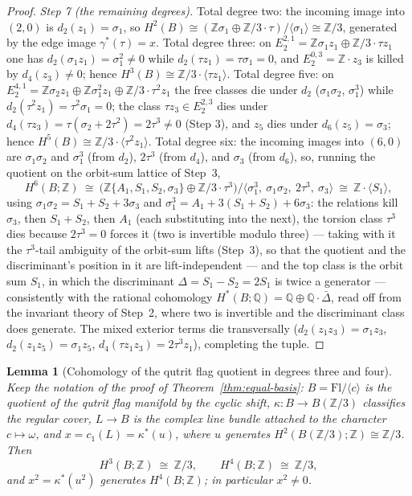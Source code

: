 \documentclass[11pt,a4paper]{article}
\newtheorem{lemma}[theorem]{Lemma}
\begin{document}
\begin{proof}
\emph{Step 7 (the remaining degrees).} Total degree two: the incoming image
into $(2,0)$ is $d_2(z_1)=\sigma_1$, so
$H^2(B)\cong(\mathbb Z\sigma_1\oplus\mathbb Z/3\cdot\tau)/\langle\sigma_1
\rangle\cong\mathbb Z/3$, generated by the edge image
$\gamma^*(\tau)=x$. Total degree three: on
$E_2^{2,1}=\mathbb Z\sigma_1z_1\oplus\mathbb Z/3\cdot\tau z_1$ one has
$d_2(\sigma_1z_1)=\sigma_1^2\ne0$ while $d_2(\tau z_1)=\tau\sigma_1=0$, and
$E_2^{0,3}=\mathbb Z\cdot z_3$ is killed by $d_4(z_3)\ne0$; hence
$H^3(B)\cong\mathbb Z/3\cdot\langle\tau z_1\rangle$. Total degree five: on
$E_2^{4,1}=\mathbb Z\sigma_2z_1\oplus\mathbb Z\sigma_1^2z_1\oplus\mathbb
Z/3\cdot\tau^2z_1$ the free classes die under $d_2$
($\sigma_1\sigma_2$, $\sigma_1^3$) while $d_2(\tau^2z_1)=\tau^2\sigma_1=0$;
the class $\tau z_3\in E_2^{2,3}$ dies under $d_4(\tau z_3)=
\tau(\sigma_2+2\tau^2)=2\tau^3\ne0$ (Step 3), and $z_5$ dies under
$d_6(z_5)=\sigma_3$; hence $H^5(B)\cong\mathbb Z/3\cdot\langle\tau^2z_1
\rangle$. Total degree six: the incoming images into $(6,0)$ are
$\sigma_1\sigma_2$ and $\sigma_1^3$ (from $d_2$), $2\tau^3$ (from $d_4$),
and $\sigma_3$ (from $d_6$), so, running the quotient on the orbit-sum
lattice of Step~3,
\[
H^6(B;\mathbb Z)\ \cong\ \bigl(\mathbb Z\{A_1,S_1,S_2,\sigma_3\}\oplus
\mathbb Z/3\cdot\tau^3\bigr)\big/\langle\sigma_1^3,\ \sigma_1\sigma_2,\
2\tau^3,\ \sigma_3\rangle\ \cong\ \mathbb Z\cdot\langle S_1\rangle,
\]
using $\sigma_1\sigma_2=S_1+S_2+3\sigma_3$ and
$\sigma_1^3=A_1+3(S_1+S_2)+6\sigma_3$: the relations kill $\sigma_3$, then
$S_1+S_2$, then $A_1$ (each substituting into the next), the torsion class
$\tau^3$ dies because $2\tau^3=0$ forces it (two is invertible modulo
three) --- taking with it the $\tau^3$-tail ambiguity of the orbit-sum
lifts (Step~3), so that the quotient and the discriminant's position in it
are lift-independent --- and the top class is the orbit sum $S_1$, in which
the discriminant
$\Delta=S_1-S_2=2S_1$ is twice a generator --- consistently with the
rational cohomology $H^*(B;\mathbb Q)=\mathbb Q\oplus\mathbb Q\cdot
\bar\Delta$, read off from the invariant theory of Step~2, where two is
invertible and the discriminant class does generate. The mixed exterior terms die
transversally ($d_2(z_1z_3)=\sigma_1z_3$, $d_2(z_1z_5)=\sigma_1z_5$,
$d_4(\tau z_1z_3)=2\tau^3z_1$), completing the tuple.
\end{proof}

\begin{lemma}[Cohomology of the qutrit flag quotient in degrees three and four]
\label{lem:flag-cohomology}
Keep the notation of the proof of Theorem~\ref{thm:equal-basis}:
$B=\mathrm{Fl}/\langle c\rangle$ is the quotient of the qutrit flag manifold by
the cyclic shift, $\kappa\colon B\to B(\mathbb Z/3)$ classifies the regular
cover, $L\to B$ is the complex line bundle attached to the character
$c\mapsto\omega$, and $x=c_1(L)=\kappa^*(u)$, where $u$ generates
$H^2(B(\mathbb Z/3);\mathbb Z)\cong\mathbb Z/3$. Then
\[
H^3(B;\mathbb Z)\ \cong\ \mathbb Z/3,
\qquad
H^4(B;\mathbb Z)\ \cong\ \mathbb Z/3,
\]
and $x^2=\kappa^*(u^2)$ generates $H^4(B;\mathbb Z)$; in particular $x^2\ne0$.
\end{lemma}
\end{document}
